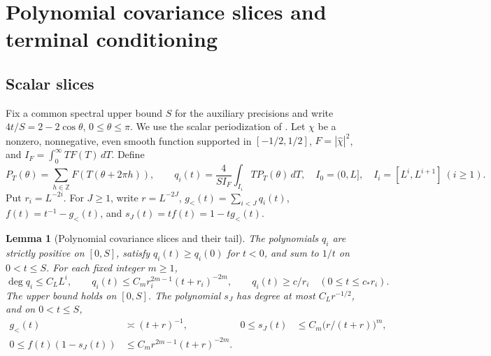 \documentclass[11pt]{article}
\newtheorem{lemma}[theorem]{Lemma}
\theoremstyle{definition}
\begin{document}
\appendix

\section{Polynomial covariance slices and terminal conditioning}
\label{app:gaussian-decomposition}

\subsection{Scalar slices}
\label{app:gaussian-scalar}
Fix a common spectral upper bound \(S\) for the auxiliary precisions and
write \(4t/S=2-2\cos\theta\), \(0\le\theta\le\pi\).
We use the scalar periodization of \cite[Lemma~2.1]{IsingCorrelation}.
Let \(\chi\) be a nonzero, nonnegative, even smooth function supported
in \([-1/2,1/2]\), \(F=|\widehat\chi|^2\), and
\(I_F=\int_0^\infty T F(T)\,dT\). Define
\begin{equation}
 P_T(\theta)=\sum_{h\in\mathbb Z}F(T(\theta+2\pi h)),\qquad
 q_i(t)=\frac{4}{S I_F}\int_{I_i}T P_T(\theta)\,dT,
 \quad I_0=(0,L],\quad I_i=[L^i,L^{i+1}]\ (i\ge1).
\end{equation}
Put \(r_i=L^{-2i}\). For \(J\ge1\), write \(r=L^{-2J}\),
\(g_<(t)=\sum_{i<J}q_i(t)\), \(f(t)=t^{-1}-g_<(t)\), and
\(s_J(t)=tf(t)=1-tg_<(t)\).

\begin{lemma}[Polynomial covariance slices and their tail]
\label{lem:scalar-polynomial-slices}
The polynomials \(q_i\) are strictly positive on \([0,S]\),
satisfy \(q_i(t)\ge q_i(0)\) for \(t<0\), and sum to \(1/t\)
on \(0<t\le S\). For each fixed integer \(m\ge1\),
\begin{equation}
 \deg q_i\le C_L L^i,\qquad
 q_i(t)\le C_m r_i^{2m-1}(t+r_i)^{-2m},\qquad
 q_i(t)\ge c/r_i\quad(0\le t\le c_*r_i).
 \label{eq:gaussian-scalar-bounds}
\end{equation}
The upper bound holds on \([0,S]\). The polynomial \(s_J\) has
degree at most \(C_Lr^{-1/2}\), and on \(0<t\le S\),
\begin{align}
 g_<(t)&\asymp (t+r)^{-1}, &
 0\le s_J(t)&\le C_m\bigl(r/(t+r)\bigr)^m,\label{eq:gaussian-partial-scalar}\\
 0\le f(t)(1-s_J(t))&\le C_m r^{2m-1}(t+r)^{-2m}.
 \label{eq:gaussian-tail-scalar}
\end{align}
\end{lemma}
\end{document}
